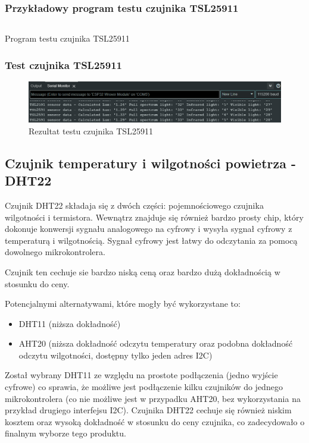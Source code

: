 \documentclass[12pt,a4paper]{article}
\begin{document}
\subsubsection{Przykładowy program testu czujnika TSL25911}

\begin{code}[H]
\inputminted[frame=lines,baselinestretch=1,breaklines,linenos,xleftmargin=1.5em]{c}{../proj/tsl2591-test/tsl2591-test.ino}

\caption{Program testu czujnika TSL25911}
\end{code}

\subsubsection{Test czujnika TSL25911}
\begin{figure}[H]
    \centering
    \includegraphics[width=\textwidth]{tsl2591-test.png}
    \caption{Rezultat testu czujnika TSL25911}
\end{figure}

\subsection{Czujnik temperatury i wilgotności powietrza - DHT22}

Czujnik DHT22 składaja się z dwóch części: pojemnościowego czujnika wilgotności i termistora. 
Wewnątrz znajduje się również bardzo prosty chip, który dokonuje konwersji sygnału analogowego na cyfrowy i wysyła sygnał cyfrowy z temperaturą i wilgotnością. 
Sygnał cyfrowy jest łatwy do odczytania za pomocą dowolnego mikrokontrolera.

Czujnik ten cechuje sie bardzo niską ceną oraz bardzo dużą dokładnością w stosunku do ceny.

Potencjalnymi alternatywami, które mogły być wykorzystane to:
\begin{itemize}
    \item DHT11 (niższa dokładność)
    \item AHT20 (niższa dokładność odczytu temperatury oraz podobna dokładność odczytu wilgotności, dostępny tylko jeden adres I2C)
\end{itemize}

Został wybrany DHT11 ze względu na prostote podłączenia (jedno wyjście cyfrowe) co sprawia, że możliwe jest podłączenie
kilku czujników do jednego mikrokontrolera (co nie możliwe jest w przypadku AHT20, bez wykorzystania na przykład drugiego interfejsu I2C).
Czujnika DHT22 cechuje się również niskim kosztem oraz wysoką dokładność w stosunku do ceny czujnika, co zadecydowało o finalnym wyborze tego produktu. 
\end{document}
